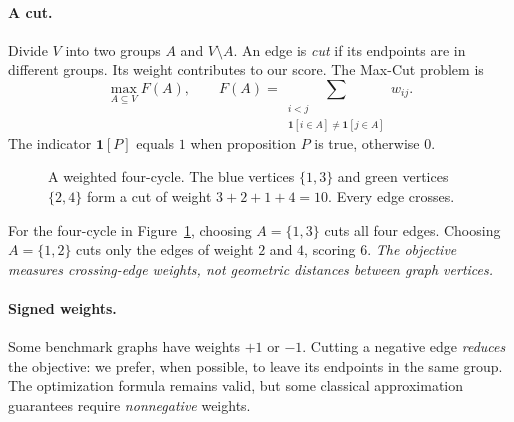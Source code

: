 \documentclass[10pt,letterpaper]{article}
\newcommand{\I}{\mathbf 1}
\begin{document}
\paragraph{A cut.} Divide $V$ into two groups $A$ and $V\setminus A$. An edge is \emph{cut} if its endpoints are in different groups. Its weight contributes to our score. The Max-Cut problem is
\begin{equation}\label{eq:cut-set}
 \max_{A\subseteq V} F(A),\qquad
 F(A)=\sum_{\substack{i<j\\\I[i\in A]\ne\I[j\in A]}}w_{ij}.
\end{equation}
The indicator $\I[P]$ equals $1$ when proposition $P$ is true, otherwise $0$.

\begin{figure}[t]
\centering
{}
\caption{A weighted four-cycle. The blue vertices $\{1,3\}$ and green vertices $\{2,4\}$ form a cut of weight $3+2+1+4=10$. Every edge crosses.}
\label{fig:cut}
\end{figure}

For the four-cycle in Figure~\ref{fig:cut}, choosing $A=\{1,3\}$ cuts all four edges. Choosing $A=\{1,2\}$ cuts only the edges of weight $2$ and $4$, scoring $6$. \emph{The objective measures crossing-edge weights, not geometric distances between graph vertices.}

\paragraph{Signed weights.} Some benchmark graphs have weights $+1$ or $-1$. Cutting a negative edge \emph{reduces} the objective: we prefer, when possible, to leave its endpoints in the same group. The optimization formula remains valid, but some classical approximation guarantees require \emph{nonnegative} weights.
\end{document}
